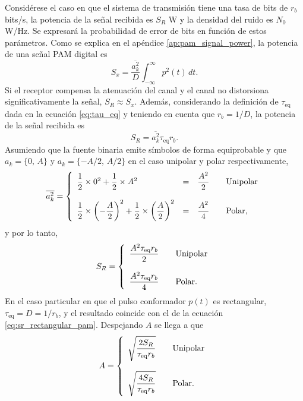 \documentclass[a4paper]{article}
\begin{document}
Considérese el caso en que el sistema de transmisión tiene una tasa de bits de \(r_b\) bits/s, la potencia de la señal recibida es \(S_R\) W y la densidad del ruido es \(N_0\) W/Hz. Se expresará la probabilidad de error de bits en función de estos parámetros. Como se explica en el apéndice \ref{ap:pam_signal_power}, la potencia de una señal PAM digital es
\[
 S_x=\frac{\overline{a_k^2}}{D}\int_{-\infty}^{\infty}p^2(t)\,dt.
\]
Si el receptor compensa la atenuación del canal y el canal no distorsiona significativamente la señal, \(S_R\approx S_x\). Además, considerando la definición de \(\tau_\textrm{eq}\) dada en la ecuación \ref{eq:tau_eq} y teniendo en cuenta que \(r_b=1/D\), la potencia de la señal recibida es
\begin{equation}\label{eq:sr_generic_pam}
 S_R=\overline{a_k^2}\tau_\textrm{eq}r_b.
\end{equation}
Asumiendo que la fuente binaria emite símbolos de forma equiprobable y que \(a_k=\lbrace 0,\,A\rbrace\) y \(a_k=\lbrace -A/2,\,A/2\rbrace\) en el caso unipolar y polar respectivamente,
\[
\overline{a_k^2}=\left\{ 
    \begin{array}{l l l l l}
    \dfrac{1}{2}\times0^2+\dfrac{1}{2}\times A^2 & = & \dfrac{A^2}{2} & & \textrm{Unipolar}\\
    \\
    \dfrac{1}{2}\times\left(-\dfrac{A}{2}\right)^2+\dfrac{1}{2}\times\left(\dfrac{A}{2}\right)^2 & = & \dfrac{A^2}{4} & & \textrm{Polar,} \end{array} \right.
\]
y por lo tanto,
\[
S_R=\left\{ 
    \begin{array}{l l l}
    \dfrac{A^2\tau_\textrm{eq}r_b}{2} & & \textrm{Unipolar}\\
    \\
    \dfrac{A^2\tau_\textrm{eq}r_b}{4} & & \textrm{Polar.} \end{array} \right.
\]
En el caso particular en que el pulso conformador \(p(t)\) es rectangular, \(\tau_\textrm{eq}=D=1/r_b\), y el resultado coincide con el de la ecuación \ref{eq:sr_rectangular_pam}. Despejando \(A\) se llega a que
\begin{equation}\label{eq:pma_amplitude_vs_sr}
 A=\left\{ 
    \begin{array}{l l l}
    \sqrt{\dfrac{2S_R}{\tau_\textrm{eq}r_b}} & & \textrm{Unipolar}\\
    \\
    \sqrt{\dfrac{4S_R}{\tau_\textrm{eq}r_b}} & & \textrm{Polar.} \end{array} \right.
\end{equation}
\end{document}
